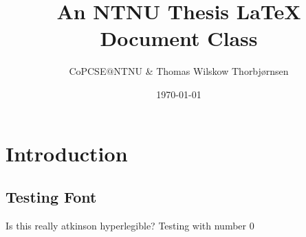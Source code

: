 \documentclass[british,titlepage]{ntnuthesis}
\title{An NTNU Thesis \LaTeX{} Document Class}
\author{CoPCSE$@$NTNU \& Thomas Wilskow Thorbjørnsen}
\date{\today}
\begin{document}
\tableofcontents

\printglossaries

\chapter{Introduction}

\section{Testing Font}

Is this really atkinson hyperlegible? Testing with number 0
\end{document}
